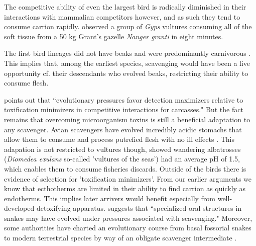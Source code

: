 \documentclass[a4paper,12pt]{article}
\begin{document}
The competitive ability of even the largest bird is radically diminished in their interactions with mammalian competitors however, and as such they tend to consume carrion rapidly. 
\cite{houston1974role} observed a group of \textit{Gyps} vultures consuming all of the soft tissue from a 50 kg Grant’s gazelle \textit{Nanger granti} in eight minutes. 

The first bird lineages did not have beaks and were predominantly carnivorous \citep{martyniuk2012field}. 
This implies that, among the earliest species, scavenging would have been a live opportunity cf. their descendants who evolved beaks, restricting their ability to consume flesh. 

\cite{shivik2006vultures} points out that ``evolutionary pressures favor detection maximizers relative to toxification minimizers in competitive interactions for carcasses." 
But the fact remains that overcoming microorganism toxins is still a beneficial adaptation to any scavenger. 
Avian scavengers have evolved incredibly acidic stomachs that allow them to consume and process putrefied flesh with no ill effects \citep{houston1975digestive,roggenbuck2014microbiome}. 
This adapation is not restricted to vultures though, \cite{gremillet2012vultures} showed wandering albatrosses (\textit{Diomedea exulans} so-called 'vultures of the seas') had an average pH of 1.5, which enables them to consume fisheries discards. 
Outside of the birds there is evidence of selection for 'toxification minimizers'.
From our earlier arguments we know that ecthotherms are limited in their ability to find carrion as quickly as endotherms. 
This implies later arrivers would benefit especially from well-developed detoxifying apparatus. 
\cite{shivik2006vultures} suggests that ``specialized oral structures in snakes may have evolved under pressures associated with scavenging."
Moreover, some authorities have charted an evolutionary course from basal fossorial snakes to modern terrestrial species by way of an obligate scavenger intermediate \citep{bauchot2006snakes}. 

\end{document}
